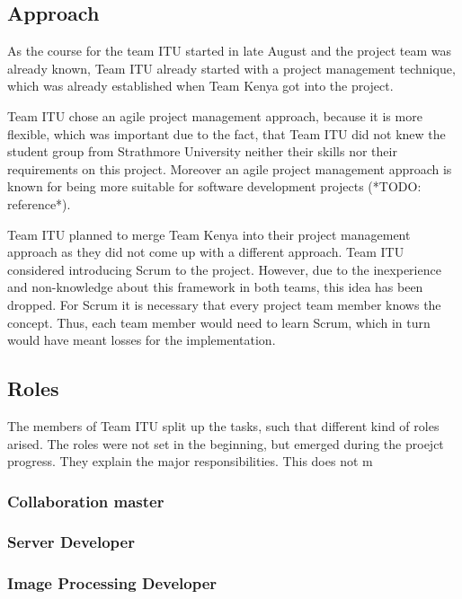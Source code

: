 \subsection{Approach}

As the course for the team ITU started in late August and the project team was already known, Team ITU already started with a project management technique, which was already established when Team Kenya got into the project.

Team ITU chose an agile project management approach, because it is more flexible, which was important due to the fact, that Team ITU did not knew the student group from Strathmore University neither their skills nor their requirements on this project. Moreover an agile project management approach is known for being more suitable for software development projects (*TODO: reference*).

Team ITU planned to merge Team Kenya into their project management approach as they did not come up with a different approach. Team ITU considered introducing Scrum to the project. However, due to the inexperience and non-knowledge about this framework in both teams, this idea has been dropped. For Scrum it is necessary that every project team member knows the concept. Thus, each team member would need to learn Scrum, which in turn would have meant losses for the implementation.


\subsection{Roles}
The members of Team ITU split up the tasks, such that different kind of roles arised. The roles were not set in the beginning, but emerged during the proejct progress. They explain the major responsibilities. This does not m

\subsubsection{Collaboration master}

\subsubsection{Server Developer}

\subsubsection{Image Processing Developer}

